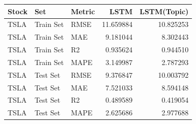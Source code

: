 \begin{tabular}{lllrr}
\toprule
Stock & Set & Metric & LSTM & LSTM(Topic) \\
\midrule
TSLA & Train Set & RMSE & 11.659884 & 10.825253 \\
TSLA & Train Set & MAE & 9.181044 & 8.302443 \\
TSLA & Train Set & R2 & 0.935624 & 0.944510 \\
TSLA & Train Set & MAPE & 3.149987 & 2.787293 \\
TSLA & Test Set & RMSE & 9.376847 & 10.003792 \\
TSLA & Test Set & MAE & 7.521033 & 8.594148 \\
TSLA & Test Set & R2 & 0.489589 & 0.419054 \\
TSLA & Test Set & MAPE & 2.625686 & 2.977688 \\
\bottomrule
\end{tabular}
